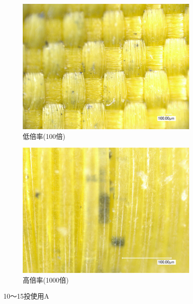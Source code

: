 \documentclass[main]{subfiles}
\begin{document}
\begin{figure}[H]
    \centering
    \begin{subfigure}[htbp]{0.45\linewidth}
        \centering
        \includegraphics[keepaspectratio, width=0.8\linewidth]{figures/縁/カーリングパッド10-15低倍率.jpg}
        \caption{低倍率(100倍)}
        \label{fig:label}
    \end{subfigure}
    \begin{subfigure}[htbp]{0.45\linewidth}
        \centering
        \includegraphics[keepaspectratio, width=0.8\linewidth]{figures/縁/カーリングパッド10-15.jpg}
        \caption{高倍率(1000倍)}
        \label{fig:label}
    \end{subfigure}
    \caption{10～15投使用A}
    \label{fig:2}
\end{figure}
    
\end{document}

